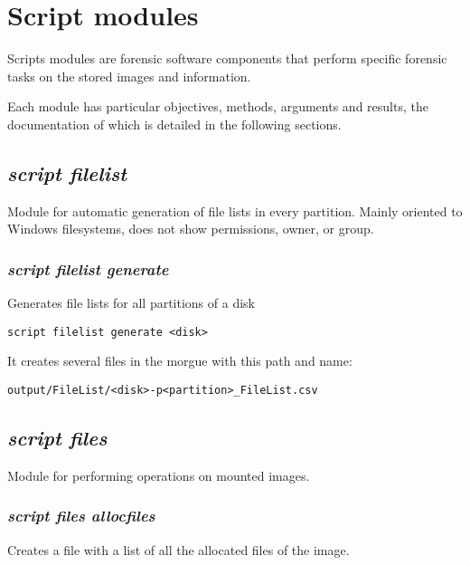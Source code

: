 \documentclass[a4paper,11pt,oneside]{report}
\begin{document}
\chapter{Script modules} \label{sec:modules}

Scripts modules are forensic software components that perform specific forensic tasks on the stored images and information.

Each module has particular objectives, methods, arguments and results, the documentation of which is detailed in the following sections.





\section{\emph{script filelist}}

Module for automatic generation of file lists in every partition. Mainly oriented to Windows filesystems, does not show permissions, owner, or group.

\subsection{\emph{script filelist generate}} 

Generates file lists for all partitions of a disk

\begin{verbatim}
script filelist generate <disk>
\end{verbatim}

It creates several files in the morgue with this path and name:

\begin{verbatim}
output/FileList/<disk>-p<partition>_FileList.csv
\end{verbatim}






\section{\emph{script files}}

Module for performing operations on mounted images.

\subsection{\emph{script files allocfiles}} 

Creates a file with a list of all the allocated files of the image.
\end{document}
